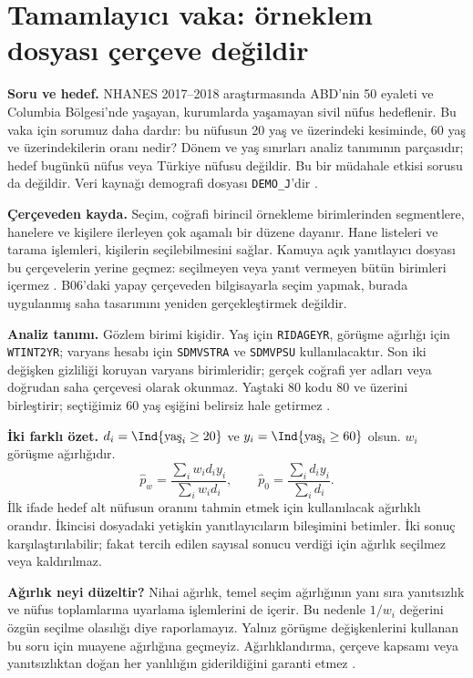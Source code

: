 \section{Tamamlayıcı vaka: örneklem dosyası çerçeve değildir}
\label{sec:v2-nhanes}

\textbf{Soru ve hedef.} NHANES 2017--2018 araştırmasında ABD'nin 50
eyaleti ve Columbia Bölgesi'nde yaşayan, kurumlarda yaşamayan sivil
nüfus hedeflenir. Bu vaka için sorumuz daha dardır: bu nüfusun 20 yaş
ve üzerindeki kesiminde, 60 yaş ve üzerindekilerin oranı nedir?
Dönem ve yaş sınırları analiz tanımının parçasıdır; hedef bugünkü
nüfus veya Türkiye nüfusu değildir. Bu bir müdahale etkisi sorusu da
değildir. Veri kaynağı demografi dosyası \texttt{DEMO\_J}'dir
\citep{nchs2020demoj,nchssampledesign}.

\textbf{Çerçeveden kayda.} Seçim, coğrafi birincil örnekleme
birimlerinden segmentlere, hanelere ve kişilere ilerleyen çok aşamalı
bir düzene dayanır. Hane listeleri ve tarama işlemleri, kişilerin
seçilebilmesini sağlar. Kamuya açık yanıtlayıcı dosyası bu çerçevelerin
yerine geçmez: seçilmeyen veya yanıt vermeyen bütün birimleri içermez
\citep{nchssampledesign}. B06'daki yapay çerçeveden bilgisayarla seçim
yapmak, burada uygulanmış saha tasarımını yeniden gerçekleştirmek değildir.

\textbf{Analiz tanımı.} Gözlem birimi kişidir. Yaş için
\texttt{RIDAGEYR}, görüşme ağırlığı için \texttt{WTINT2YR}; varyans
hesabı için \texttt{SDMVSTRA} ve \texttt{SDMVPSU} kullanılacaktır.
Son iki değişken gizliliği koruyan varyans birimleridir; gerçek coğrafi
yer adları veya doğrudan saha çerçevesi olarak okunmaz. Yaştaki 80
kodu 80 ve üzerini birleştirir; seçtiğimiz 60 yaş eşiğini belirsiz
hale getirmez \citep{nchs2020demoj}.

\begin{definitionbox}
\textbf{İki farklı özet.} $d_i=\Ind{\text{yaş}_i\geq20}$ ve
$y_i=\Ind{\text{yaş}_i\geq60}$ olsun. $w_i$ görüşme ağırlığıdır.
\[
\widehat p_w=\frac{\sum_i w_i d_i y_i}{\sum_i w_i d_i},
\qquad
\widehat p_0=\frac{\sum_i d_i y_i}{\sum_i d_i}.
\]
İlk ifade hedef alt nüfusun oranını tahmin etmek için kullanılacak
ağırlıklı orandır. İkincisi dosyadaki yetişkin yanıtlayıcıların
bileşimini betimler. İki sonuç karşılaştırılabilir; fakat tercih edilen
sayısal sonucu verdiği için ağırlık seçilmez veya kaldırılmaz.
\end{definitionbox}

\textbf{Ağırlık neyi düzeltir?} Nihai ağırlık, temel seçim ağırlığının
yanı sıra yanıtsızlık ve nüfus toplamlarına uyarlama işlemlerini de
içerir. Bu nedenle $1/w_i$ değerini özgün seçilme olasılığı diye
raporlamayız. Yalnız görüşme değişkenlerini kullanan bu soru için
muayene ağırlığına geçmeyiz. Ağırlıklandırma, çerçeve kapsamı veya
yanıtsızlıktan doğan her yanlılığın giderildiğini garanti etmez
\citep{nchsweighting}.

